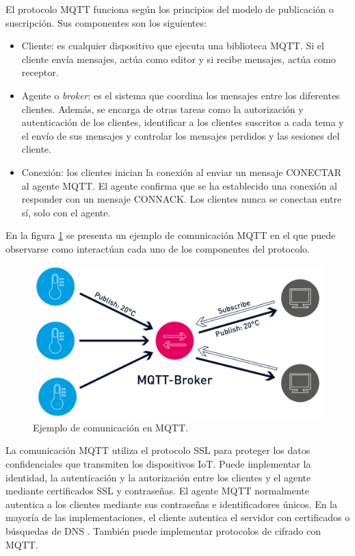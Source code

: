 El protocolo MQTT funciona según los principios del modelo de publicación o suscripción. Sus componentes son los siguientes:
\begin{itemize}
\item Cliente: es cualquier dispositivo que ejecuta una biblioteca MQTT. Si el cliente envía mensajes, actúa como editor y si recibe mensajes, actúa como receptor.
\item Agente o \emph{broker}: es el sistema que coordina los mensajes entre los diferentes clientes. Además, se encarga de otras tareas como la autorización y autenticación de los clientes, identificar a los clientes suscritos a cada tema y el envío de sus mensajes y controlar los mensajes perdidos y las sesiones del cliente. 
\item Conexión: los clientes inician la conexión al enviar un mensaje CONECTAR al agente MQTT. El agente confirma que se ha establecido una conexión al responder con un mensaje CONNACK. Los clientes nunca se conectan entre sí, solo con el agente.
\end{itemize}

En la figura \ref{fig:ejemploDeComunicacionEnMQTT} se presenta un ejemplo de comunicación MQTT en el que puede observarse como interactúan cada uno de los componentes del protocolo.
 
\begin{figure}[H]
	\centering
	\includegraphics[width=.8\textwidth]{./Figures/Ejemplo de comunicacion en MQTT.jpg}
	\caption{Ejemplo de comunicación en MQTT\protect\footnotemark.}
	\label{fig:ejemploDeComunicacionEnMQTT}
\end{figure}


La comunicación MQTT utiliza el protocolo SSL para proteger los datos confidenciales que transmiten los dispositivos IoT. Puede implementar la identidad, la autenticación y la autorización entre los clientes y el agente mediante certificados SSL y contraseñas. El agente MQTT normalmente autentica a los clientes mediante sus contraseñas e identificadores únicos. En la mayoría de las implementaciones, el cliente autentica el servidor con certificados o búsquedas de DNS \citep{WEBSITE:DNS}. También puede implementar protocolos de cifrado con MQTT. 

